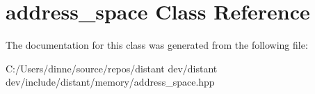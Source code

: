 \hypertarget{classaddress__space}{}\section{address\+\_\+space Class Reference}
\label{classaddress__space}


The documentation for this class was generated from the following file\+:\begin{DoxyCompactItemize}
\item 
C\+:/\+Users/dinne/source/repos/distant dev/distant dev/include/distant/memory/address\+\_\+space.\+hpp\end{DoxyCompactItemize}
